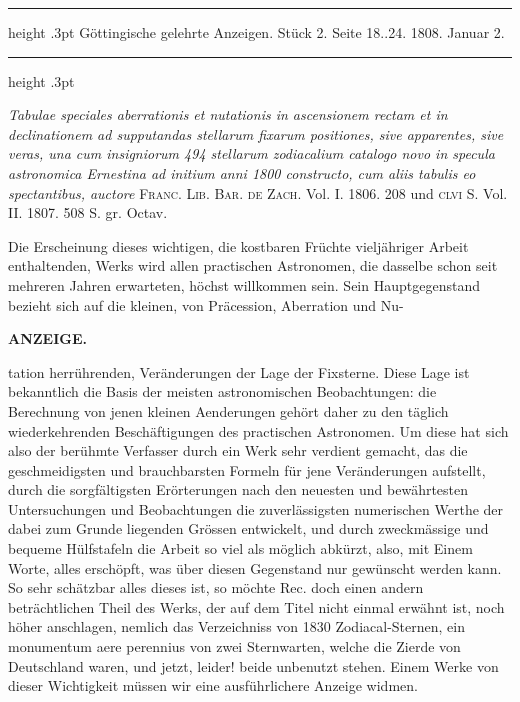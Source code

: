 \par{}\bigskip
\hypertarget{native-494-lower}{}\label{native-494-lower}
\begin{center}
\parbox{.9\linewidth}{%
\centering\small
\hrule height .3pt\relax\vspace{2.5pt}
Göttingische gelehrte Anzeigen. Stück 2. Seite 18..24. 1808. Januar 2.\par
\vspace{2.5pt}\hrule height .3pt\relax
}
\end{center}
\par\nobreak\medskip

\emph{Tabulae speciales aberrationis et nutationis in ascensionem rectam et in declinationem ad supputandas stellarum fixarum positiones, sive apparentes, sive veras, una cum insigniorum 494 stellarum zodiacalium catalogo novo in specula astronomica Ernestina ad initium anni \textup{1800} constructo, cum aliis tabulis eo spectantibus, auctore} \textsc{Franc. Lib. Bar. de Zach}. Vol. I. 1806. 208 und \textsc{clvi} S. Vol. II. 1807. 508 S. gr. Octav.

Die Erscheinung dieses wichtigen, die kostbaren Früchte vieljähriger Arbeit enthaltenden, Werks wird allen practischen Astronomen, die dasselbe schon seit mehreren Jahren erwarteten, höchst willkommen sein. Sein Hauptgegenstand bezieht sich auf die kleinen, von Präcession, Aberration und Nu-\par
{}
\clearpage
\noindent{}%
%
\parbox[t]{\dimexpr\linewidth-24mm\relax}{\centering\footnotesize\bfseries ANZEIGE.\par}%
\makebox[12mm][r]{}\par\nobreak\medskip
\noindent tation herrührenden, Veränderungen der Lage der Fixsterne. Diese Lage ist bekanntlich die Basis der meisten astronomischen Beobachtungen: die Berechnung von jenen kleinen Aenderungen gehört daher zu den täglich wiederkehrenden Beschäftigungen des practischen Astronomen. Um diese hat sich also der berühmte Verfasser durch ein Werk sehr verdient gemacht, das die geschmeidigsten und brauchbarsten Formeln für jene Veränderungen aufstellt, durch die sorgfältigsten Erörterungen nach den neuesten und bewährtesten Untersuchungen und Beobachtungen die zuverlässigsten numerischen Werthe der dabei zum Grunde liegenden Grössen entwickelt, und durch zweckmässige und bequeme Hülfstafeln die Arbeit so viel als möglich abkürzt, also, mit Einem Worte, alles erschöpft, was über diesen Gegenstand nur gewünscht werden kann. So sehr schätzbar alles dieses ist, so möchte Rec. doch einen andern beträchtlichen Theil des Werks, der auf dem Titel nicht einmal erwähnt ist, noch höher anschlagen, nemlich das Verzeichniss von 1830 Zodiacal-Sternen, ein monumentum aere perennius von zwei Sternwarten, welche die Zierde von Deutschland waren, und jetzt, leider! beide unbenutzt stehen. Einem Werke von dieser Wichtigkeit müssen wir eine ausführlichere Anzeige widmen.

